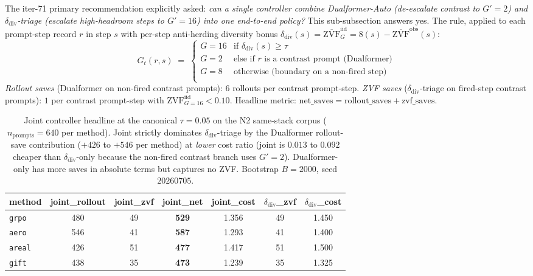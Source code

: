 \documentclass{article}
\begin{document}
The iter-71 primary recommendation explicitly asked: \emph{can a single
controller combine Dualformer-Auto (de-escalate contrast to $G'{=}2$)
and $\delta_{\mathrm{div}}$-triage (escalate high-headroom steps to
$G'{=}16$) into one end-to-end policy?} This sub-subsection answers
yes. The rule, applied to each prompt-step record $r$ in step $s$ with
per-step anti-herding diversity bonus
$\delta_{\mathrm{div}}(s) = \overline{\mathrm{ZVF}}^{\mathrm{iid}}_G{=}8(s)
- \overline{\mathrm{ZVF}}^{\mathrm{obs}}(s)$:
\begin{equation*}
G_t(r, s) \;=\; \begin{cases}
G{=}16 & \text{if $\delta_{\mathrm{div}}(s) \geq \tau$} \\
G{=}2  & \text{else if $r$ is a contrast prompt (Dualformer)} \\
G{=}8  & \text{otherwise (boundary on a non-fired step)} \\
\end{cases}
\end{equation*}
\emph{Rollout saves} (Dualformer on non-fired contrast prompts):
$6$ rollouts per contrast prompt-step. \emph{ZVF saves}
($\delta_{\mathrm{div}}$-triage on fired-step contrast prompts):
$1$ per contrast prompt-step with $\mathrm{ZVF}^{\mathrm{iid}}_{G{=}16} < 0.10$.
Headline metric: $\mathrm{net\_saves} = \mathrm{rollout\_saves} +
\mathrm{zvf\_saves}$.

\begin{table}[t]
\centering\small
\caption{Joint controller headline at the canonical $\tau{=}0.05$ on
the N2 same-stack corpus ($n_{\mathrm{prompts}}{=}640$ per method).
Joint strictly dominates $\delta_{\mathrm{div}}$-triage by the
Dualformer rollout-save contribution ($+426$ to $+546$ per method)
at \emph{lower} cost ratio (joint is $0.013$ to $0.092$ cheaper than
$\delta_{\mathrm{div}}$-only because the non-fired contrast branch uses
$G'{=}2$). Dualformer-only has more saves in absolute terms but
captures no ZVF. Bootstrap $B{=}2000$, seed $20260705$.}
\label{tab:p7-joint-controller}
\begin{tabular}{lcccccc}
\toprule
method & joint\_rollout & joint\_zvf & joint\_net & joint\_cost &
$\delta_{\mathrm{div}}$\_zvf & $\delta_{\mathrm{div}}$\_cost \\
\midrule
\texttt{grpo}  & 480 & 49 & \textbf{529} & 1.356 & 49 & 1.450 \\
\texttt{aero}  & 546 & 41 & \textbf{587} & 1.293 & 41 & 1.400 \\
\texttt{areal} & 426 & 51 & \textbf{477} & 1.417 & 51 & 1.500 \\
\texttt{gift}  & 438 & 35 & \textbf{473} & 1.239 & 35 & 1.325 \\
\bottomrule
\end{tabular}
\end{table}
\end{document}
